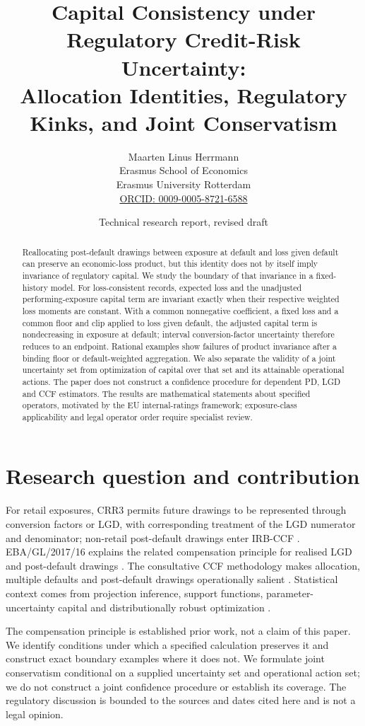 \documentclass[a4paper,10pt]{article}
\title{Capital Consistency under Regulatory Credit-Risk Uncertainty:\\Allocation Identities, Regulatory Kinks, and Joint Conservatism}
\author{Maarten Linus Herrmann\\
\small Erasmus School of Economics\\
\small Erasmus University Rotterdam\\
\small\href{https://orcid.org/0009-0005-8721-6588}{ORCID: 0009-0005-8721-6588}}
\date{\small Technical research report, revised draft}
\begin{document}
\maketitle

\begin{abstract}
Reallocating post-default drawings between exposure at default and loss given
default can preserve an economic-loss product, but this identity does not by
itself imply invariance of regulatory capital. We study the boundary of that
invariance in a fixed-history model. For loss-consistent records, expected loss
and the unadjusted performing-exposure capital term are invariant exactly when
their respective weighted loss moments are constant. With a common nonnegative
coefficient, a fixed loss and a common floor and clip applied to loss given
default, the adjusted capital term is nondecreasing in exposure at default;
interval conversion-factor uncertainty therefore reduces to an endpoint.
Rational examples show failures of product invariance after a binding floor or
default-weighted aggregation. We also separate the validity of a joint
uncertainty set from optimization of capital over that set and its attainable
operational actions. The paper does not construct a confidence procedure for
dependent PD, LGD and CCF estimators. The results are mathematical statements
about specified operators, motivated by the EU internal-ratings framework;
exposure-class applicability and legal operator order require specialist review.
\end{abstract}

\section{Research question and contribution}

For retail exposures, CRR3 permits future drawings to be represented through
conversion factors or LGD, with corresponding treatment of the LGD numerator
and denominator; non-retail post-default drawings enter IRB-CCF
\cite{crr3}. EBA/GL/2017/16 explains the related compensation principle for
realised LGD and post-default drawings \cite{eba2017}. The consultative CCF
methodology makes allocation, multiple defaults and post-default drawings
operationally salient \cite{ebaccf2025}. Statistical context comes from
projection inference, support functions, parameter-uncertainty capital and
distributionally robust optimization
\cite{kaido2019,delage2010,loeffler2003,baviera2022}.

The compensation principle is established prior work, not a claim of this paper.
We identify conditions under which a specified calculation preserves it and
construct exact boundary examples where it does not. We formulate joint
conservatism conditional on a supplied uncertainty set and operational action
set; we do not construct a joint confidence procedure or establish its coverage.
The regulatory discussion is bounded to the sources and dates cited here and is
not a legal opinion.
\end{document}

